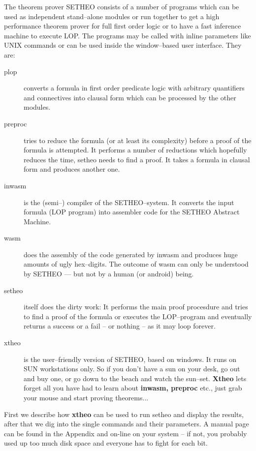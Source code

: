 
The theorem prover SETHEO consists of a number of programs
which can be used as independent stand--alone modules or run together
to get a high performance theorem prover for full first order logic
or to have a fast inference machine to execute LOP.
The programs may be called with inline parameters like UNIX
commands or can be used inside the window--based user interface.
They are:
\begin{description}
\item[plop]
converts a formula in first order predicate logic
with arbitrary quantifiers and connectives into clausal form
which can be processed by the other modules.
\item[preproc]
tries to reduce the formula (or at least its complexity) before
a proof of the formula is attempted. It performs a number of reductions which
hopefully reduces the time, setheo needs to find a proof.
It takes a formula in clausal form and produces another one.
\item[inwasm]
is the (semi--) compiler of the SETHEO--system. It converts
the input formula (LOP program) into assembler code for
the SETHEO Abstract Machine.
\item[wasm]
does the assembly of the code generated by inwasm and
produces huge amounts of ugly hex--digits.
The outcome of wasm can only be understood by SETHEO --- but not
by a human (or android) being.
\item[setheo]
itself does the dirty work: It performs the main proof procesdure
and tries to find a proof
of the formula or executes the LOP--program and eventually
returns a success or a fail -- or nothing -- as it may loop forever.
\item[xtheo]
is the user--friendly version of SETHEO, based
on windows. It runs on SUN workstations only.
So if you don't have a sun on your desk, go out and buy one,
or go down to the beach and watch
the sun--set. {\bf Xtheo} lets forget all you have had to learn
about {\bf inwasm, preproc} etc., just grab your mouse and start
proving theorems...
\end{description}

First we describe how {\bf xtheo} can be used to run setheo and
display the results, after that we dig into the single commands
and their parameters. A manual page can be found in the Appendix
and on-line on your system -- if not, you probably used up
too much disk space and everyone has to fight for each bit.
